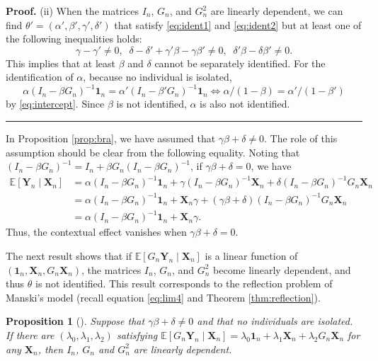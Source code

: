 \documentclass[10.5pt, A4paper, openany, uplatex]{book}
\newcommand{\mbf}{\mathbf}
\newcommand{\E}{\mathbb{E}}
\newtheorem{proposition}[theorem]{Proposition}
{\theorembodyfont{\upshape}
\newtheorem{remark}{Remark}
}
\newenvironment{proof}[1][Proof]{\textbf{#1.} }{\  \rule{0.5em}{0.5em}}
\numberwithin{equation}{section}
\begin{document}
\begin{proof}
	(ii) When the matrices $I_n$, $G_n$, and $G_n^2$ are linearly dependent, we can find $\theta' = (\alpha', \beta', \gamma', \delta')$ that satisfy \eqref{eq:ident1} and \eqref{eq:ident2} but at least one of the following inequalities holds:
	\[
	\gamma - \gamma' \neq 0, \;\; \delta - \delta' + \gamma'\beta - \gamma\beta' \neq 0, \;\; \delta'\beta - \delta\beta' \neq 0.
	\]
	This implies that at least $\beta$ and $\delta$ cannot be separately identified.
	For the identification of $\alpha$, because no individual is isolated,
	\[
	\alpha (I_n - \beta G_n)^{-1}\mathbf{1}_n = \alpha' (I_n - \beta' G_n)^{-1}\mathbf{1}_n \iff \alpha/(1 - \beta) = \alpha'/(1 - \beta')
	\]
	by \eqref{eq:intercept}.
	Since $\beta$ is not identified, $\alpha$ is also not identified.
\end{proof}
\bigskip

In Proposition \ref{prop:bra}, we have assumed that $\gamma \beta + \delta \neq 0$.
The role of this assumption should be clear from the following equality.
Noting that $(I_n - \beta G_n)^{-1} = I_n +  \beta G_n(I_n - \beta G_n)^{-1}$, if $\gamma \beta + \delta = 0$, we have
\begin{align*}
	\E[\mbf{Y}_n \mid \mbf{X}_n] 
	& = \alpha (I_n - \beta G_n)^{-1}\mathbf{1}_n + \gamma (I_n - \beta G_n)^{-1}\mbf{X}_n + \delta (I_n - \beta G_n)^{-1}G_n \mbf{X}_n\\
	& = \alpha (I_n - \beta G_n)^{-1}\mathbf{1}_n + \mbf{X}_n \gamma +  (\gamma \beta + \delta) (I_n - \beta G_n)^{-1}G_n \mbf{X}_n \\
	& = \alpha (I_n - \beta G_n)^{-1}\mathbf{1}_n + \mbf{X}_n \gamma.
\end{align*}
Thus, the contextual effect vanishes when $\gamma \beta + \delta = 0$.
\bigskip

The next result shows that if $\E[G_n \mbf{Y}_n \mid \mbf{X}_n]$ is a linear function of $(\mbf{1}_n, \mbf{X}_n, G_n\mbf{X}_n)$, the matrices $I_n$, $G_n$, and $G_n^2$ become linearly dependent, and thus $\theta$ is not identified.
This result corresponds to the reflection problem of Manski's model (recall equation \eqref{eq:lim4} and Theorem \ref{thm:reflection}).
\begin{proposition}[\cite{bramoulle2009identification}]
	Suppose that $\gamma \beta + \delta \neq 0$ and that no individuals are isolated.
	If there are $(\lambda_0, \lambda_1, \lambda_2)$ satisfying $\E[G_n \mbf{Y}_n \mid \mbf{X}_n] = \lambda_0\mbf{1}_n + \lambda_1\mbf{X}_n + \lambda_2 G_n \mbf{X}_n$ for any $\mbf{X}_n$, then $I_n$, $G_n$ and $G_n^2$ are linearly dependent.
\end{proposition}
\end{document}
